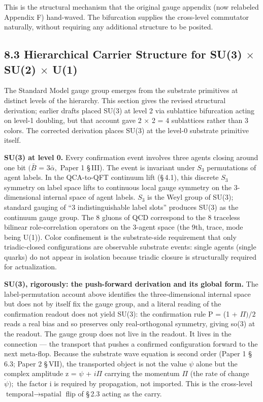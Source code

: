 \documentclass[11pt,oneside]{report}
\theoremstyle{definition}
\theoremstyle{remark}
\begin{document}
This is the structural mechanism that the original gauge appendix (now
relabeled Appendix F) hand-waved. The bifurcation supplies the
cross-level commutator naturally, without requiring any additional
structure to be posited.

\subsection*{8.3 Hierarchical Carrier Structure for SU(3) \ensuremath{\times} SU(2) \ensuremath{\times} U(1)}

The Standard Model gauge group emerges from the substrate primitives at
distinct levels of the hierarchy. This section gives the revised
structural derivation; earlier drafts placed SU(3) at level 2 via
sublattice bifurcation acting on level-1 doubling, but that account gave
2 \ensuremath{\times} 2 = 4 sublattices rather than 3 colors. The corrected derivation
places SU(3) at the level-0 substrate primitive itself.

\textbf{SU(3) at level 0.} Every confirmation event involves three
agents closing around one bit \ensuremath{(\bar{B}} = \ensuremath{3\bar{\alpha},} Paper 1 \S\,III). The event is
invariant under \ensuremath{S_{3}} permutations of agent labels. In the QCA-to-QFT
continuum lift (\S\,4.1), this discrete \ensuremath{S_{3}} symmetry on label space lifts to
continuous local gauge symmetry on the 3-dimensional internal space of
agent labels. \ensuremath{S_{3}} is the Weyl group of SU(3); standard gauging of ``3
indistinguishable label slots'' produces SU(3) as the continuum gauge
group. The 8 gluons of QCD correspond to the 8 traceless bilinear
role-correlation operators on the 3-agent space (the 9th, trace, mode
being U(1)). Color confinement is the substrate-side requirement that
only triadic-closed configurations are observable substrate events:
single agents (single quarks) do not appear in isolation because triadic
closure is structurally required for actualization.

\textbf{SU(3), rigorously: the push-forward derivation and its global
form.} The label-permutation account above identifies the
three-dimensional internal space but does not by itself fix the gauge
group, and a literal reading of the confirmation readout does not yield
SU(3): the confirmation rule P = (1 + \ensuremath{\Pi )/2} reads a real bias and so
preserves only real-orthogonal symmetry, giving so(3) at the readout.
The gauge group does not live in the readout. It lives in the connection
--- the transport that pushes a confirmed configuration forward to the
next meta-flop. Because the substrate wave equation is second order
(Paper 1 \S\,6.3; Paper 2 \S\,VII), the transported object is not the value \ensuremath{\psi}
alone but the complex amplitude z = \ensuremath{\psi} + \ensuremath{i\Pi} carrying the momentum \ensuremath{\Pi} (the
rate of change \ensuremath{\dot{\psi});} the factor i is required by propagation, not
imported. This is the cross-level \ensuremath{\text{temporal}\to \text{spatial}} flip of \S\,2.3 acting
as the carry.
\end{document}
